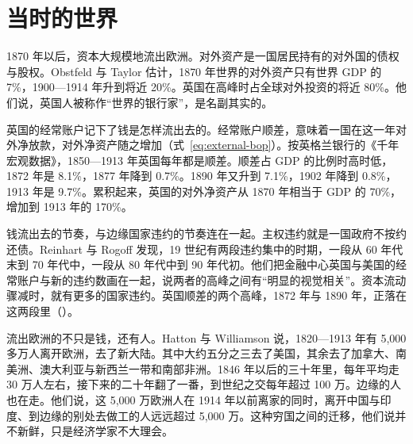 \section{当时的世界}\label{sec:periph-world}

1870 年以后，资本大规模地流出欧洲。对外资产是一国居民持有的对外国的债权与股权。Obstfeld 与 Taylor 估计，1870 年世界的对外资产只有世界 GDP 的 7\%，1900—1914 年升到将近 20\%\cite{obstfeld2002}。英国在高峰时占全球对外投资的将近 80\%\cite{obstfeld2002}。他们说，英国人被称作“世界的银行家”，是名副其实的\cite{obstfeld2002}。

英国的经常账户记下了钱是怎样流出去的。经常账户顺差，意味着一国在这一年对外净放款，对外净资产随之增加（式~\eqref{eq:external-bop}）。按英格兰银行的《千年宏观数据》，1850—1913 年英国每年都是顺差\cite{boe2017}。顺差占 GDP 的比例时高时低，1872 年是 8.1\%，1877 年降到 0.7\%\cite{boe2017}。1890 年又升到 7.1\%，1902 年降到 0.8\%，1913 年是 9.7\%\cite{boe2017}。累积起来，英国的对外净资产从 1870 年相当于 GDP 的 70\%，增加到 1913 年的 170\%\cite{boe2017}。


钱流出去的节奏，与边缘国家违约的节奏连在一起。主权违约就是一国政府不按约还债。Reinhart 与 Rogoff 发现，19 世纪有两段违约集中的时期，一段从 60 年代末到 70 年代中，一段从 80 年代中到 90 年代初\cite{reinhart2008tid}。他们把金融中心英国与美国的经常账户与新的违约数画在一起，说两者的高峰之间有“明显的视觉相关”\cite{reinhart2008tid}。资本流动骤减时，就有更多的国家违约\cite{reinhart2008tid}。英国顺差的两个高峰，1872 年与 1890 年，正落在这两段里（）。

流出欧洲的不只是钱，还有人。Hatton 与 Williamson 说，1820—1913 年有 5,000 多万人离开欧洲，去了新大陆\cite{hatton2002}。其中大约五分之三去了美国，其余去了加拿大、南美洲、澳大利亚与新西兰一带和南部非洲\cite{hatton2002}。1846 年以后的三十年里，每年平均走 30 万人左右，接下来的二十年翻了一番，到世纪之交每年超过 100 万\cite{hatton2002}。边缘的人也在走。他们说，这 5,000 万欧洲人在 1914 年以前离家的同时，离开中国与印度、到边缘的别处去做工的人远远超过 5,000 万\cite{hatton2002}。这种穷国之间的迁移，他们说并不新鲜，只是经济学家不大理会\cite{hatton2002}。

